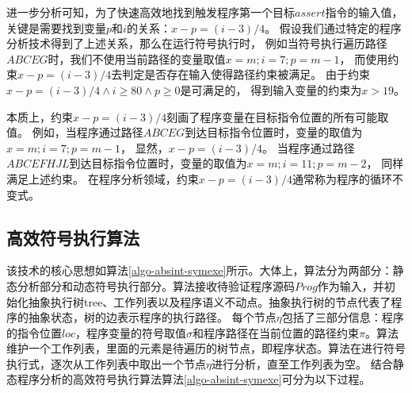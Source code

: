进一步分析可知，为了快速高效地找到触发程序第一个目标$assert$指令的输入值，
关键是需要找到变量$p$和$i$的关系：$x-p = (i-3)/4$。
假设我们通过特定的程序分析技术得到了上述关系，那么在运行符号执行时，
例如当符号执行遍历路径$ABCEG$时，我们不使用当前路径的变量取值$x=m;i=7;p=m-1$，
而使用约束$x-p = (i-3)/4$去判定是否存在输入使得路径约束被满足。
由于约束$x-p = (i-3)/4 \wedge i\geq 80 \wedge p \geq 0$是可满足的，
得到输入变量的约束为$x>19$。

本质上，约束$x-p = (i-3)/4$刻画了程序变量在目标指令位置的所有可能取值。
例如，当程序通过路径$ABCEG$到达目标指令位置时，变量的取值为$x=m;i=7;p=m-1$，
显然，$x-p = (i-3)/4$。
当程序通过路径$ABCEFHJL$到达目标指令位置时，变量的取值为$x=m;i=11;p=m-2$，
同样满足上述约束。
在程序分析领域，约束$x-p = (i-3)/4$通常称为程序的循环不变式。


\subsection{高效符号执行算法}

该技术的核心思想如算法\ref{algo-absint-symexe}所示。大体上，算法分为两部分：静态分析部分和动态符号执行部分。算法接收待验证程序源码$Prog$作为输入，并初始化抽象执行树tree、工作列表以及程序语义不动点。抽象执行树的节点代表了程序的抽象状态，树的边表示程序的执行路径。
每个节点$\eta$包括了三部分信息：程序的指令位置$loc$，程序变量的符号取值$\sigma$和程序路径在当前位置的路径约束$\pi$。算法维护一个工作列表，里面的元素是待遍历的树节点，即程序状态。算法在进行符号执行式，逐次从工作列表中取出一个节点$\eta$进行分析，直至工作列表为空。
结合静态程序分析的高效符号执行算法算法\ref{algo-absint-symexe}可分为以下过程。


%
%
%
%

